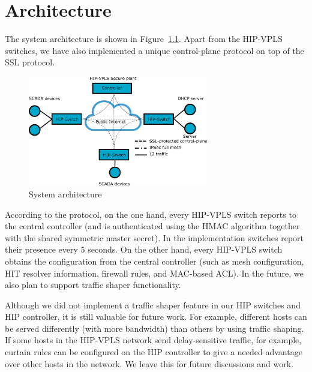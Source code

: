 \chapter{Architecture}

The system architecture is shown in Figure~\ref{fig:architecture}. 
Apart from the HIP-VPLS switches, we have also implemented a unique 
control-plane protocol on top of the SSL protocol. 


\begin{figure}[h!]
\centering
\includegraphics[width=0.7\textwidth]{graphics/arch.png}
\caption{System architecture}
\label{fig:architecture}
\end{figure} 

According to the protocol, on the one hand, every HIP-VPLS 
switch reports to the central controller (and is authenticated 
using the HMAC algorithm together with the shared symmetric 
master secret). In the implementation switches report their presence every $5$ 
seconds. On the other hand, every HIP-VPLS switch obtains 
the configuration from the central controller (such as mesh 
configuration, HIT resolver information, firewall rules, and 
MAC-based ACL). In the future, we also plan to support traffic 
shaper functionality.

Although we did not implement a traffic shaper feature in our 
HIP switches and HIP  controller, it is still valuable for future 
work. For example, different hosts can be served differently 
(with more bandwidth) than others by using traffic shaping. If 
some hosts in the HIP-VPLS network send delay-sensitive traffic, 
for example, curtain rules can be configured on the HIP controller 
to give a needed advantage over other hosts in the network. We 
leave this for future discussions and work.

